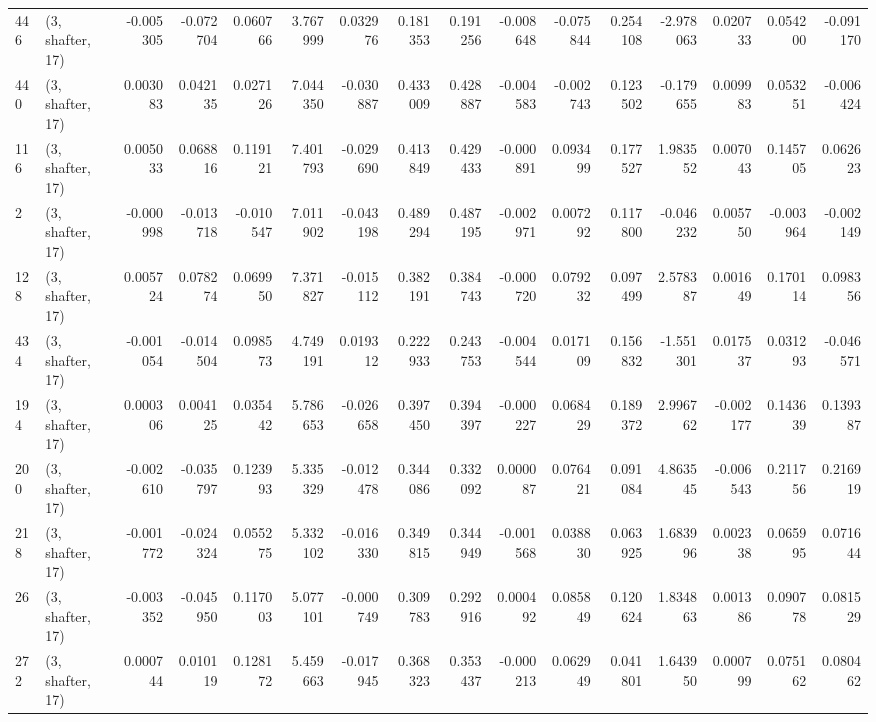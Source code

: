 \begin{tabular}{llrrrrrrrrrrrrrr}
446 &  (3, shafter, 17) &  -0.005305 & -0.072704 &  0.060766 &    3.767999 &  0.032976 &   0.181353 &  0.191256 & -0.008648 & -0.075844 &  0.254108 &   -2.978063 &  0.020733 &  0.054200 & -0.091170 \\
440 &  (3, shafter, 17) &   0.003083 &  0.042135 &  0.027126 &    7.044350 & -0.030887 &   0.433009 &  0.428887 & -0.004583 & -0.002743 &  0.123502 &   -0.179655 &  0.009983 &  0.053251 & -0.006424 \\
116 &  (3, shafter, 17) &   0.005033 &  0.068816 &  0.119121 &    7.401793 & -0.029690 &   0.413849 &  0.429433 & -0.000891 &  0.093499 &  0.177527 &    1.983552 &  0.007043 &  0.145705 &  0.062623 \\
2   &  (3, shafter, 17) &  -0.000998 & -0.013718 & -0.010547 &    7.011902 & -0.043198 &   0.489294 &  0.487195 & -0.002971 &  0.007292 &  0.117800 &   -0.046232 &  0.005750 & -0.003964 & -0.002149 \\
128 &  (3, shafter, 17) &   0.005724 &  0.078274 &  0.069950 &    7.371827 & -0.015112 &   0.382191 &  0.384743 & -0.000720 &  0.079232 &  0.097499 &    2.578387 &  0.001649 &  0.170114 &  0.098356 \\
434 &  (3, shafter, 17) &  -0.001054 & -0.014504 &  0.098573 &    4.749191 &  0.019312 &   0.222933 &  0.243753 & -0.004544 &  0.017109 &  0.156832 &   -1.551301 &  0.017537 &  0.031293 & -0.046571 \\
194 &  (3, shafter, 17) &   0.000306 &  0.004125 &  0.035442 &    5.786653 & -0.026658 &   0.397450 &  0.394397 & -0.000227 &  0.068429 &  0.189372 &    2.996762 & -0.002177 &  0.143639 &  0.139387 \\
200 &  (3, shafter, 17) &  -0.002610 & -0.035797 &  0.123993 &    5.335329 & -0.012478 &   0.344086 &  0.332092 &  0.000087 &  0.076421 &  0.091084 &    4.863545 & -0.006543 &  0.211756 &  0.216919 \\
218 &  (3, shafter, 17) &  -0.001772 & -0.024324 &  0.055275 &    5.332102 & -0.016330 &   0.349815 &  0.344949 & -0.001568 &  0.038830 &  0.063925 &    1.683996 &  0.002338 &  0.065995 &  0.071644 \\
26  &  (3, shafter, 17) &  -0.003352 & -0.045950 &  0.117003 &    5.077101 & -0.000749 &   0.309783 &  0.292916 &  0.000492 &  0.085849 &  0.120624 &    1.834863 &  0.001386 &  0.090778 &  0.081529 \\
272 &  (3, shafter, 17) &   0.000744 &  0.010119 &  0.128172 &    5.459663 & -0.017945 &   0.368323 &  0.353437 & -0.000213 &  0.062949 &  0.041801 &    1.643950 &  0.000799 &  0.075162 &  0.080462 \\

\end{tabular}
